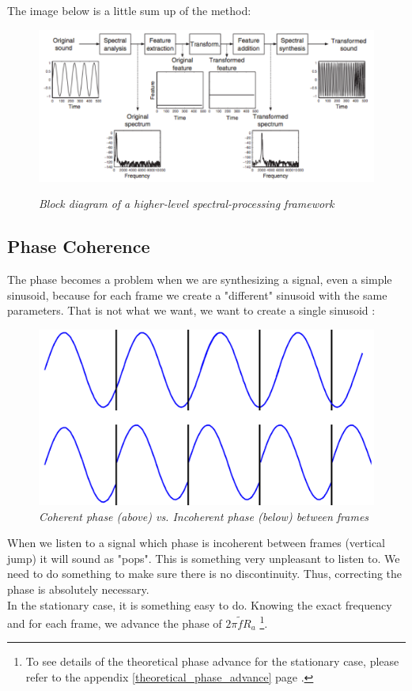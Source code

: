 \documentclass[]{article}
\begin{document}
The image below is a little sum up of the method:

\begin{figure}[H]
	\begin{center}
	{\includegraphics[scale = 0.8]{schema.png}}
	\caption{\it Block diagram of a higher-level spectral-processing framework}
	\end{center}
\end{figure}

\newpage

\subsection{Phase Coherence}\label{phase-coherence}
\hspace{15pt}The phase becomes a problem when we are synthesizing a signal, even a simple sinusoid, because for each frame we create a "different" sinusoid with the same parameters. That is not what we want, we want to create a single sinusoid : 
\begin{figure} [H]
	\centering
	\includegraphics[scale = 0.2]{coherentphase.png}
	\caption {\it Coherent phase (above) vs. Incoherent phase (below) between frames}
\end{figure}
When we listen to a signal which phase is incoherent between frames (vertical jump) it will sound as "pops".  This is something very unpleasant to listen to. We need to do something to make sure there is no discontinuity. Thus, correcting the phase is absolutely necessary. \\
In the stationary case, it is something easy to do. Knowing the exact frequency and for each frame, we advance the phase of $2\pi \tilde{f} R_a$  \footnote{To see details of the theoretical phase advance for the stationary case, please refer to the appendix \ref{theoretical_phase_advance} page \pageref{theoretical_phase_advance}.}.
\end{document}

